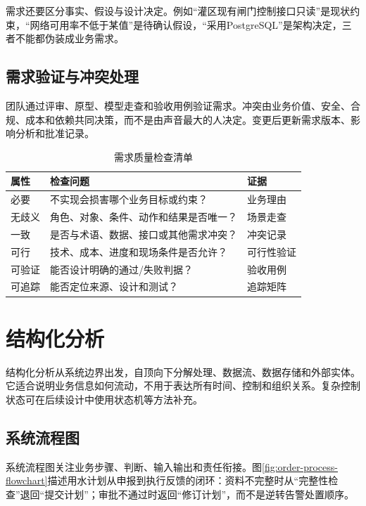 需求还要区分事实、假设与设计决定。例如“灌区现有闸门控制接口只读”是现状约束，“网络可用率不低于某值”是待确认假设，“采用PostgreSQL”是架构决定，三者不能都伪装成业务需求。

\subsection{需求验证与冲突处理}

团队通过评审、原型、模型走查和验收用例验证需求。冲突由业务价值、安全、合规、成本和依赖共同决策，而不是由声音最大的人决定。变更后更新需求版本、影响分析和批准记录。

\begin{table}[htbp]
\centering
\caption{需求质量检查清单}
\label{tab:requirement-quality-check}
\begin{tabular}{p{2.4cm}p{7.2cm}p{3.0cm}}
\toprule
属性 & 检查问题 & 证据 \\
\midrule
必要 & 不实现会损害哪个业务目标或约束？ & 业务理由 \\
无歧义 & 角色、对象、条件、动作和结果是否唯一？ & 场景走查 \\
一致 & 是否与术语、数据、接口或其他需求冲突？ & 冲突记录 \\
可行 & 技术、成本、进度和现场条件是否允许？ & 可行性验证 \\
可验证 & 能否设计明确的通过/失败判据？ & 验收用例 \\
可追踪 & 能否定位来源、设计和测试？ & 追踪矩阵 \\
\bottomrule
\end{tabular}
\end{table}

\section{结构化分析}

结构化分析从系统边界出发，自顶向下分解处理、数据流、数据存储和外部实体。它适合说明业务信息如何流动，不用于表达所有时间、控制和组织关系。复杂控制状态可在后续设计中使用状态机等方法补充。

\subsection{系统流程图}

系统流程图关注业务步骤、判断、输入输出和责任衔接。图\ref{fig:order-process-flowchart}描述用水计划从申报到执行反馈的闭环：资料不完整时从“完整性检查”退回“提交计划”；审批不通过时返回“修订计划”，而不是逆转告警处置顺序。

